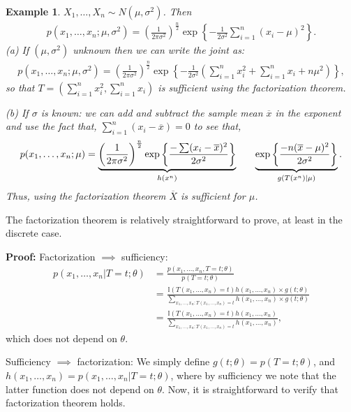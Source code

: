 \documentclass[twoside,12pt]{article}
\newtheorem{example}[theorem]{Example}
\begin{document}
\begin{example}
$X_1, \ldots, X_n \sim N(\mu, \sigma^2)$.
Then
\begin{align*}
p(x_1,\ldots,x_n;\mu, \sigma^2) = 
\left(\frac{1}{2\pi\sigma^2}\right)^{\frac{n}{2}} 
\exp \left\{-\frac{1}{2\sigma^2} \sum_{i=1}^n (x_i - \mu)^2 \right\}.
\end{align*}
(a) If $(\mu, \sigma^2)$ unknown
then we can write the joint as:
\begin{align*}
p(x_1,\ldots,x_n;\mu, \sigma^2) = 
\left(\frac{1}{2\pi\sigma^2}\right)^{\frac{n}{2}} 
\exp \left\{-\frac{1}{2\sigma^2} \left(\sum_{i=1}^n x_i^2 + \sum_{i=1}^n x_i +  n\mu^2 \right) \right\},
\end{align*}
so that $T = (\sum_{i=1}^n x_i^2, \sum_{i=1}^n x_i)$ is sufficient using the factorization theorem.

(b) If $\sigma$ is known: we can add and subtract the sample mean $\overline{x}$ in the exponent and use the fact that, $\sum_{i=1}^n (x_i - \overline{x}) = 0$ to see that,
$$
p(x_1,\ldots,x_n;\mu) =
\underbrace{\left(\frac{1}{2\pi \sigma^2}\right)^{\frac{n}{2}} 
\exp \left\{\frac{-\sum(x_i-\overline{x})^2}
{2\sigma^2}\right\}}_{h(x^n)} \hspace{.25in}
\underbrace{\exp \left\{\frac{-n(\overline{x}-\mu)^2}
{2\sigma^2}\right\}}_{g(T(x^n)|\mu)}.
$$
Thus, using the factorization theorem
$\overline{X}$ is sufficient for $\mu$.

\noindent 
\end{example}

The factorization theorem is relatively straightforward to prove, at least in the discrete case.

{\bf Proof: } Factorization $\implies$ sufficiency: 
\begin{align*}
p(x_1,\ldots,x_n | T = t ; \theta) &= \frac{p(x_1,\ldots,x_n, T = t ; \theta) }{p(T = t; \theta)} \\
&= \frac{\mathbb{I}(T(x_1,\ldots,x_n) = t) h(x_1,\ldots,x_n) \times g(t; \theta)}{ \sum_{x_1,\ldots,x_n: T(x_1,\ldots,x_n) = t} h(x_1,\ldots,x_n)\times g(t;\theta)} \\
&= \frac{\mathbb{I}(T(x_1,\ldots,x_n) = t) h(x_1,\ldots,x_n) }{ \sum_{x_1,\ldots,x_n: T(x_1,\ldots,x_n) = t} h(x_1,\ldots,x_n)},
\end{align*}
which does not depend on $\theta$.

Sufficiency $\implies$ factorization: We simply define $g(t; \theta) = p(T = t; \theta)$, and $h(x_1,\ldots,x_n) = p(x_1,\ldots,x_n| T = t; \theta)$, where by sufficiency we note that the latter function does not depend on $\theta$. Now, it is straightforward to verify that factorization theorem holds.
\end{document}
